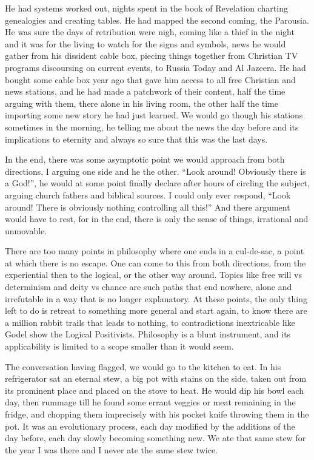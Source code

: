 \documentclass[ebook, 10pt, openright, onecolumn]{memoir}
\begin{document}
He had systems worked out, nights spent in the book of Revelation charting
genealogies and creating tables.  He had mapped the second coming, the Parousia.
He was sure the days of retribution were nigh, coming like a thief in the night
and it was for the living to watch for the signs and symbols, news he would
gather from his dissident cable box, piecing things together from Christian
TV programs discoursing on current events, to Russia Today and Al Jazeera.  He
had bought some cable box year ago that gave him access to all free Christian
and news stations, and he had made a patchwork of their content, half the time
arguing with them, there alone in his living room, the other half the time
importing some new story he had just learned.  We would go though his stations
sometimes in the morning, he telling me about the news the day before and its
implications to eternity and always so sure that this was the last days.

In the end, there was some asymptotic point we would approach from both
directions, I arguing one side and he the other. ``Look around! Obviously there
is a God!'', he would at some point finally declare after hours of circling the
subject, arguing church fathers and biblical sources.  I could only ever
respond, ``Look around! There is obviously nothing controlling all this!'' And
there argument would have to rest, for in the end, there is only the sense of
things, irrational and unmovable.

There are too many points in philosophy where one ends in a cul-de-sac, a point
at which there is no escape.  One can come to this from both directions, from
the experiential then to the logical, or the other way around.  Topics like free
will vs determinism and deity vs chance are such paths that end nowhere, alone
and irrefutable in a way that is no longer explanatory.  At these points, the
only thing left to do is retreat to something more general and start again, to
know there are a million rabbit trails that leads to nothing, to contradictions
inextricable like Godel show the Logical Positivists.  Philosophy is a blunt
instrument, and its applicability is limited to a scope smaller than it would
seem. 

The conversation having flagged, we would go to the kitchen to eat.  In his
refrigerator sat an eternal stew, a big pot with stains on the side, taken out
from its prominent place and placed on the stove to heat.  He would dip his bowl
each day, then rummage till he found some errant veggies or meat remaining in
the fridge, and chopping them imprecisely with his pocket knife throwing them in
the pot.  It was an evolutionary process, each day modified by the additions of
the day before, each day slowly becoming something new.  We ate that same stew
for the year I was there and I never ate the same stew twice.
\end{document}

